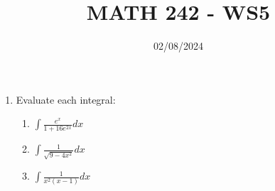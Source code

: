 \documentclass[12pt]{article}
\title{MATH 242 - WS5}
\date{02/08/2024}
\begin{document}
\maketitle


\begin{enumerate}

\item Evaluate each integral:
\begin{enumerate}
    \item $\int\frac{e^x}{1+16e^{2x}}dx$
    \vfill
    \item $\int\frac{1}{\sqrt{9-4x^2}}dx$
    \vfill
    \newpage
    \item $\int\frac{1}{x^2(x-1)}dx$
    \vfill
    \newpage
\end{enumerate}

\end{enumerate}
\end{document}
